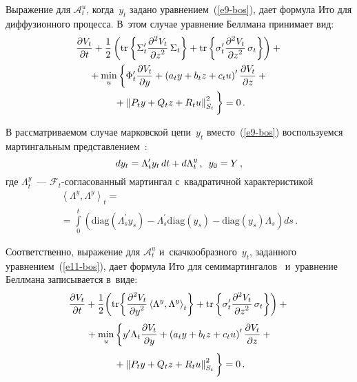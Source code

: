 \begin{multicols}{2}
     Выражение для $\mathcal{A}_t^u$, когда~$y_t$ задано  
уравнением~(\ref{e9-bos}), дает формула Ито для диффузионного процесса. 
В~этом случае уравнение Беллмана принимает вид:
     \begin{multline}
     \fr{\partial V_t}{\partial t} +\fr{1}{2}\left( \mathrm{tr}\left\{ 
\Sigma_t^\prime \fr{\partial^2 V_t}{\partial z^2}\,\Sigma_t\right\} 
+\mathrm{tr}\left\{ \sigma_t^\prime \fr{\partial^2 V_t}{\partial 
z^2}\,\sigma_t\right\}\right)+{}\\
     {}+ \min\limits_u \left\{ \Phi_t^\prime \fr{\partial V_t}{\partial y} +\left( 
a_t y +b_t z+ c_t u\right)^\prime \fr{\partial V_t}{\partial z}+{}\right.\\
\left.{}+
    \left\| P_t y+ Q_t z +R_t u\right\|^2_{S_t}
    \vphantom{\fr{\partial V_t}{\partial y}}
    \right\}=0\,.
     \label{e10-bos}
\end{multline}
     
     В рассматриваемом случае марковской цепи~$y_t$  
вместо~(\ref{e9-bos}) воспользуемся мартингальным  
пред\-став\-ле\-ни\-ем~\cite{2-bos}:
     \begin{equation}
     dy_t= \Lambda_t^\prime y_t \,dt +d\Lambda_t^y\,,\enskip y_0=Y\,,
     \label{e11-bos}
     \end{equation}
где $\Lambda_t^y$~--- $\mathcal{F}_t$-со\-гла\-со\-ван\-ный мартингал  
с~квад\-ра\-тич\-ной характеристикой 
\begin{multline*}
\left\langle \Lambda^y, \Lambda^y\right\rangle_t ={}\\
{}= \int\limits_0^t \left( 
\mathrm{diag}\left(\Lambda^\prime_s y_s\right) -
\Lambda^\prime_s\mathrm{diag}\left( y_s\right) -\mathrm{diag}\left( 
y_s\right)\Lambda_s\right) ds\,.
\end{multline*}
 
     
     Соответственно, выражение для $\mathcal{A}_t^u$ 
и~скачкообразного~$y_t$, заданного уравнением~(\ref{e11-bos}), дает 
формула Ито для семимартингалов~\cite{11-bos} и~уравнение Беллмана 
записывается в~виде:
     \begin{multline}
     \fr{\partial V_t}{\partial t}+\fr{1}{2}\!\left( \mathrm{tr}\!\left\{ \fr{\partial^2 
V_t}{\partial y^2}\left\langle \Lambda^y, \Lambda^y\right\rangle_t\right\} 
+\mathrm{tr} \left\{ \sigma_t^\prime \fr{\partial^2 V_t}{\partial 
z^2}\,\sigma_t\right\}\right)+{}\\[3pt]
     {}+
     \min\limits_u \left\{ y^\prime \Lambda_t \fr{\partial V_t}{\partial y} +\left( 
a_t y+b_t z+c_t u\right)^\prime \fr{\partial V_t}{\partial z} +{}\right.\hspace*{-2.20961pt}\\[3pt]
\left.{}+\left\| P_t y+Q_t 
z+R_t u\right\|^2_{S_t}
\vphantom{\fr{\partial V_t}{\partial y}}
\right\}=0\,.
     \label{e12-bos}
     \end{multline}
     

\end{multicols}
